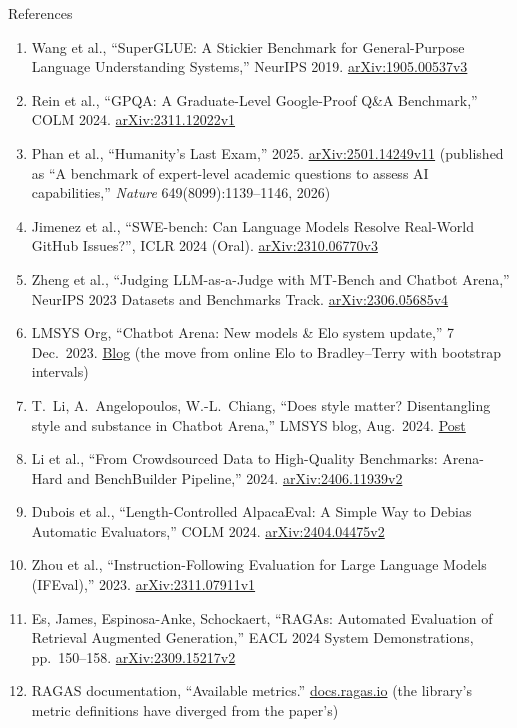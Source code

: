 \begin{frame}[allowframebreaks]{References}
\begin{enumerate}
    \item Wang et al., ``SuperGLUE: A Stickier Benchmark for General-Purpose Language Understanding Systems,'' NeurIPS 2019. \href{https://arxiv.org/abs/1905.00537v3}{arXiv:1905.00537v3}
    \item Rein et al., ``GPQA: A Graduate-Level Google-Proof Q\&A Benchmark,'' COLM 2024. \href{https://arxiv.org/abs/2311.12022v1}{arXiv:2311.12022v1}
    \item Phan et al., ``Humanity's Last Exam,'' 2025. \href{https://arxiv.org/abs/2501.14249v11}{arXiv:2501.14249v11} (published as ``A benchmark of expert-level academic questions to assess AI capabilities,'' \textit{Nature} 649(8099):1139--1146, 2026)
    \item Jimenez et al., ``SWE-bench: Can Language Models Resolve Real-World GitHub Issues?'', ICLR 2024 (Oral). \href{https://arxiv.org/abs/2310.06770v3}{arXiv:2310.06770v3}
    \item Zheng et al., ``Judging LLM-as-a-Judge with MT-Bench and Chatbot Arena,'' NeurIPS 2023 Datasets and Benchmarks Track. \href{https://arxiv.org/abs/2306.05685v4}{arXiv:2306.05685v4}
    \item LMSYS Org, ``Chatbot Arena: New models \& Elo system update,'' 7 Dec.\ 2023. \href{https://www.lmsys.org/blog/2023-12-07-leaderboard/}{Blog} (the move from online Elo to Bradley--Terry with bootstrap intervals)
    \item T.~Li, A.~Angelopoulos, W.-L.~Chiang, ``Does style matter? Disentangling style and substance in Chatbot Arena,'' LMSYS blog, Aug.\ 2024. \href{https://www.lmsys.org/blog/2024-08-28-style-control/}{Post}
    \item Li et al., ``From Crowdsourced Data to High-Quality Benchmarks: Arena-Hard and BenchBuilder Pipeline,'' 2024. \href{https://arxiv.org/abs/2406.11939v2}{arXiv:2406.11939v2}
    \item Dubois et al., ``Length-Controlled AlpacaEval: A Simple Way to Debias Automatic Evaluators,'' COLM 2024. \href{https://arxiv.org/abs/2404.04475v2}{arXiv:2404.04475v2}
    \item Zhou et al., ``Instruction-Following Evaluation for Large Language Models (IFEval),'' 2023. \href{https://arxiv.org/abs/2311.07911v1}{arXiv:2311.07911v1}
    \item Es, James, Espinosa-Anke, Schockaert, ``RAGAs: Automated Evaluation of Retrieval Augmented Generation,'' EACL 2024 System Demonstrations, pp.~150--158. \href{https://arxiv.org/abs/2309.15217v2}{arXiv:2309.15217v2}
    \item RAGAS documentation, ``Available metrics.'' \href{https://docs.ragas.io/en/stable/concepts/metrics/available_metrics/}{docs.ragas.io} (the library's metric definitions have diverged from the paper's)

\end{enumerate}
\end{frame}
